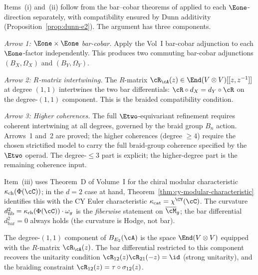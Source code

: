 \begin{remark}
\label{rem:cy-b-argument}
Items~(i) and~(ii) follow from the bar--cobar theorems of \cite{VolI}
applied to each $\Eone$-direction separately, with
compatibility ensured by Dunn additivity
(Proposition~\ref{prop:dunn-e2}). The argument has three components.

\emph{Arrow 1: $\Eone \times \Eone$ bar-cobar.} Apply the Vol~I
bar-cobar adjunction to each $\Eone$-factor independently. This produces
two commuting bar-cobar adjunctions $(B_X, \Omega_X)$ and
$(B_Y, \Omega_Y)$.

\emph{Arrow 2: $R$-matrix intertwining.} The $R$-matrix
$\cR_\cA(z) \in \End(V \otimes V)[[z, z^{-1}]]$ at degree $(1,1)$
intertwines the two bar differentials: $\cR \circ d_X = d_Y \circ \cR$
on the degree-$(1,1)$ component. This is the braided compatibility
condition.

\emph{Arrow 3: Higher coherences.} The full $\Etwo$-equivariant
refinement requires coherent intertwining at all degrees, governed by
the braid group $B_n$ action. Arrows~1 and~2 are proved; the higher
coherences (degree $\geq 4$) require the
chosen strictified model to carry the full braid-group coherence
specified by the $\Etwo$ operad. The degree-$\leq 3$ part is explicit;
the higher-degree part is the remaining coherence input.

Item~(iii) uses Theorem~D of Volume~I for the chiral modular
characteristic $\kappa_{\mathrm{ch}}(\Phi(\cC))$; in the $d = 2$
case at hand, Theorem~\ref{thm:cy-modular-characteristic} identifies
this with the CY Euler characteristic
$\kappa_{\mathrm{cat}} = \chi^{\CY}(\cC)$. The curvature
$d_{\mathrm{fib}}^2 = \kappa_{\mathrm{ch}}(\Phi(\cC)) \cdot \omega_g$ is the
\emph{fiberwise} statement on $\overline{\cM}_g$; the bar differential
$d^2_{\mathrm{bar}} = 0$ always holds (the curvature is Hodge, not bar).
\end{remark}

\begin{proposition}
\label{prop:e2-bar-degree-11}
The degree-$(1,1)$ component of $B_{E_2}(\cA)$ is the space
$\End(V \otimes V)$ equipped with the $R$-matrix
$\cR_\cA(z)$. The bar differential restricted to this component
recovers the unitarity condition $\cR_{12}(z) \cR_{21}(-z) = \id$
(strong unitarity), and the braiding constraint
$\cR_{12}(z) = \tau \circ \sigma_{12}(z)$.
\end{proposition}

